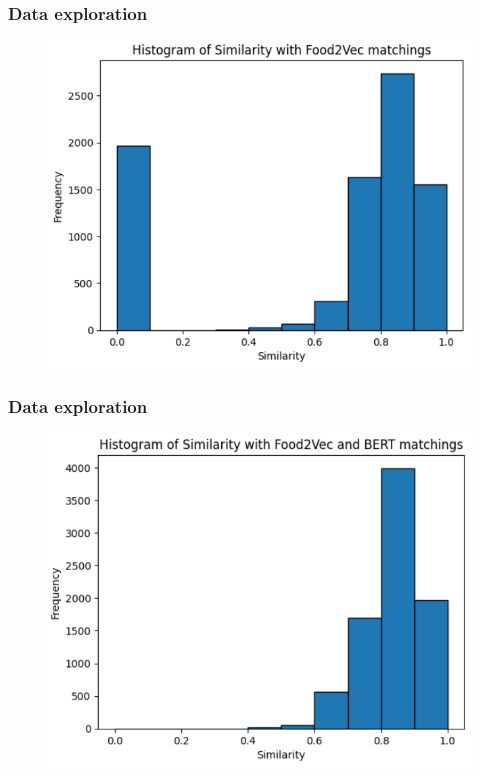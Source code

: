 \documentclass{beamer}
\begin{document}
\begin{frame}
	\frametitle{Data exploration}
	\begin{figure}[H]
		\centering
		\includegraphics[width=0.9\linewidth]{img/plot_sim_f2v.png}
	\end{figure}
\end{frame}

\begin{frame}
	\frametitle{Data exploration}
	\begin{figure}[H]
		\centering
		\includegraphics[width=0.9\linewidth]{img/plot_sim_f2v_bert.png}
	\end{figure}
\end{frame}
\end{document}
